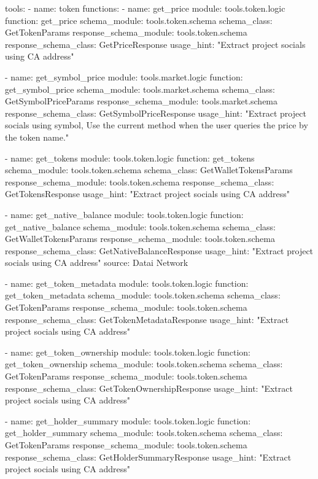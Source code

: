 
tools:
  - name: token
    functions:
      - name: get_price
        module: tools.token.logic
        function: get_price
        schema_module: tools.token.schema
        schema_class: GetTokenParams
        response_schema_module: tools.token.schema
        response_schema_class: GetPriceResponse
        usage_hint: "Extract project socials using CA address"

      - name: get_symbol_price
        module: tools.market.logic
        function: get_symbol_price
        schema_module: tools.market.schema
        schema_class: GetSymbolPriceParams
        response_schema_module: tools.market.schema
        response_schema_class: GetSymbolPriceResponse
        usage_hint: "Extract project socials using symbol, Use the current method when the user queries the price by the token name."

      - name: get_tokens
        module: tools.token.logic
        function: get_tokens
        schema_module: tools.token.schema
        schema_class: GetWalletTokensParams
        response_schema_module: tools.token.schema
        response_schema_class: GetTokensResponse
        usage_hint: "Extract project socials using CA address"

      - name: get_native_balance
        module: tools.token.logic
        function: get_native_balance
        schema_module: tools.token.schema
        schema_class: GetWalletTokensParams
        response_schema_module: tools.token.schema
        response_schema_class: GetNativeBalanceResponse
        usage_hint: "Extract project socials using CA address"
        source: Datai Network

      - name: get_token_metadata
        module: tools.token.logic
        function: get_token_metadata
        schema_module: tools.token.schema
        schema_class: GetTokenParams
        response_schema_module: tools.token.schema
        response_schema_class: GetTokenMetadataResponse
        usage_hint: "Extract project socials using CA address"

      - name: get_token_ownership
        module: tools.token.logic
        function: get_token_ownership
        schema_module: tools.token.schema
        schema_class: GetTokenParams
        response_schema_module: tools.token.schema
        response_schema_class: GetTokenOwnershipResponse
        usage_hint: "Extract project socials using CA address"

      - name: get_holder_summary
        module: tools.token.logic
        function: get_holder_summary
        schema_module: tools.token.schema
        schema_class: GetTokenParams
        response_schema_module: tools.token.schema
        response_schema_class: GetHolderSummaryResponse
        usage_hint: "Extract project socials using CA address"

